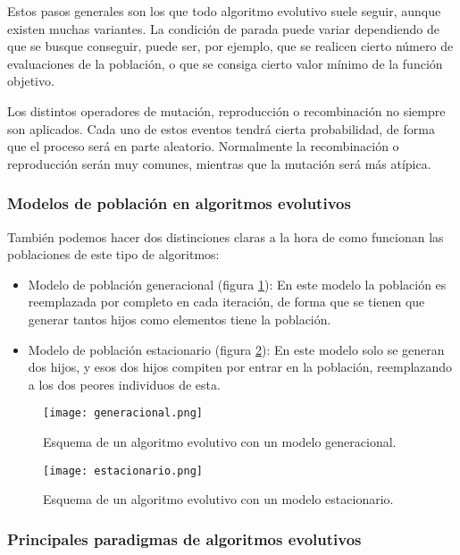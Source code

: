 Estos pasos generales son los que todo algoritmo evolutivo suele seguir, aunque existen muchas variantes. La condición de parada puede variar dependiendo de que se busque conseguir, puede ser, por ejemplo, que se realicen cierto número de evaluaciones de la población, o que se consiga cierto valor mínimo de la función objetivo.

Los distintos operadores de mutación, reproducción o recombinación no siempre son aplicados. Cada uno de estos eventos tendrá cierta probabilidad, de forma que el proceso será en parte aleatorio. Normalmente la recombinación o reproducción serán muy comunes, mientras que la mutación será más atípica.


\subsubsection{Modelos de población en algoritmos evolutivos}

También podemos hacer dos distinciones claras a la hora de como funcionan las poblaciones de este tipo de algoritmos:

\begin{itemize}
	\item Modelo de población generacional (figura \ref{fig:modelo_generacioal}): En este modelo la población es reemplazada por completo en cada iteración, de forma que se tienen que generar tantos hijos como elementos tiene la población.
	\item Modelo de población estacionario (figura \ref{fig:modelo_estacionario}): En este modelo solo se generan dos hijos, y esos dos hijos compiten por entrar en la población, reemplazando a los dos peores individuos de esta.
\end{itemize}

\begin{figure}[H]
    \centering
	  \texttt{[image: generacional.png]}
    \caption{Esquema de un algoritmo evolutivo con un modelo generacional.}
	 \label{fig:modelo_generacioal}
\end{figure}

\begin{figure}[H]
    \centering
	  \texttt{[image: estacionario.png]}
    \caption{Esquema de un algoritmo evolutivo con un modelo estacionario.}
	 \label{fig:modelo_estacionario}
\end{figure}


\subsubsection{Principales paradigmas de algoritmos evolutivos}

